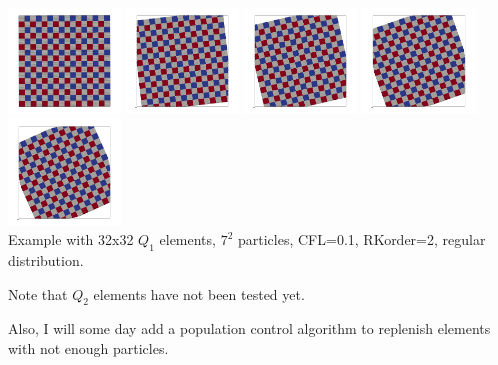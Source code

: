 \begin{center}
\includegraphics[width=3cm]{python_codes/fieldstone_37/particles0000}
\includegraphics[width=3cm]{python_codes/fieldstone_37/particles0005}
\includegraphics[width=3cm]{python_codes/fieldstone_37/particles0010}
\includegraphics[width=3cm]{python_codes/fieldstone_37/particles0015}
\includegraphics[width=3cm]{python_codes/fieldstone_37/particles0019}\\
{\captionfont Example with 32x32 $Q_1$ elements, $7^2$ particles, CFL=0.1, RKorder=2, regular distribution.}
\end{center}

Note that $Q_2$ elements have not been tested yet.

Also, I will some day add a population control algorithm to replenish elements with not enough particles.

